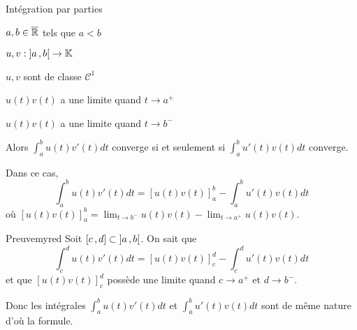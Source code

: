     \begin{theo}{Intégration par parties}{}
        \begin{soient}
            \item $a, b \in \overline{\mathbb{R}}$ tels que $a < b$
            \item $u,v : \left] a \, , b \right[ \to \mathbb{K}$
        \end{soient}
        \begin{suppose}
            \item $u,v$ sont de classe $\mathcal{C}^1$
            \item $u(t)v(t)$ a une limite quand $t \to a^+$
            \item $u(t)v(t)$ a une limite quand $t \to b^-$
        \end{suppose}
        Alors $\int_{a}^{b} u(t)v'(t)dt$ converge si et seulement si $\int_{a}^{b} u'(t)v(t) dt$ converge.

        Dans ce cas, 
        \[ \int_{a}^{b} u(t)v'(t)dt = \left[u(t)v(t)\right]_a^b - \int_{a}^{b} u'(t)v(t)dt \]   
        où $\left[u(t)v(t)\right]_a^b = \lim_{t \to b^-} u(t)v(t) - \lim_{t \to a^+} u(t)v(t)$.
    \end{theo}

    \begin{demo}{Preuve}{myred}
        Soit $\left[ c \, , d \right] \subset \left] a \, , b \right[$. On sait que 
        \[ \int_{c}^{d} u(t)v'(t)dt = \left[u(t)v(t)\right]_c^d - \int_{c}^{d} u'(t)v(t)dt \]    
        et que $\left[u(t)v(t)\right]_c^d$ possède une limite quand $c \to a^+$ et $d \to b^-$.

        Donc les intégrales $\int_{a}^{b} u(t)v'(t)dt$ et $\int_{a}^{b} u'(t)v(t) dt$ sont de même nature d’où la formule.
    \end{demo}

